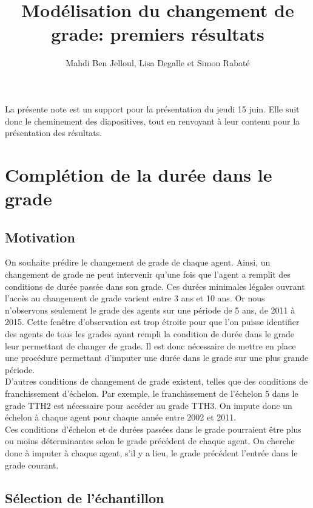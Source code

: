 \documentclass[11pt,a4paper]{article}
\begin{document}
\title{Modélisation du changement de grade: premiers résultats}


\author{Mahdi Ben Jelloul, Lisa Degalle et Simon Rabat\'e}


\maketitle


La présente note est un support pour la présentation du jeudi 15 juin. Elle suit donc le cheminement des diapositives, tout en renvoyant à leur contenu pour la présentation des résultats. 


\section{Complétion de la durée dans le grade}
\subsection{Motivation}

On souhaite prédire le changement de grade de chaque agent. Ainsi, un changement de grade ne peut intervenir qu'une fois que l'agent a remplit des conditions de durée passée dans son grade. Ces durées minimales légales ouvrant l'accès au changement de grade varient entre 3 ans et 10 ans. Or nous n'observons seulement le grade des agents sur une période de 5 ans, de 2011 à 2015. Cette fenêtre d'observation est trop étroite pour que l'on puisse identifier des agents de tous les grades ayant rempli la condition de durée dans le grade leur permettant de changer de grade. Il est donc nécessaire de mettre en place une procédure permettant d'imputer une durée dans le grade sur une plus grande période.\\
\indent D'autres conditions de changement de grade existent, telles que des conditions de franchissement d'échelon. Par exemple, le franchissement de l'échelon 5 dans le grade TTH2 est nécessaire pour accéder au grade TTH3. On impute donc un échelon à chaque agent pour chaque année entre 2002 et 2011.\\
\indent Ces conditions d'échelon et de durées passées dans le grade pourraient être plus ou moins déterminantes selon le grade précédent de chaque agent. On cherche donc à imputer à chaque agent, s'il y a lieu, le grade précédent l'entrée dans le grade courant.

\subsection{Sélection de l'échantillon}
\end{document}
